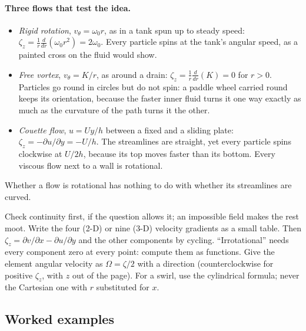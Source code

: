 \paragraph{Three flows that test the idea.}
\begin{itemize}[nosep,leftmargin=*]
\item \emph{Rigid rotation}, $v_\theta = \omega_0 r$, as in a tank spun up to steady speed: $\zeta_z = \frac{1}{r}\frac{d}{dr}(\omega_0 r^2) = 2\omega_0$. Every particle spins at the tank's angular speed, as a painted cross on the fluid would show.
\item \emph{Free vortex}, $v_\theta = K/r$, as around a drain: $\zeta_z = \frac{1}{r}\frac{d}{dr}(K) = 0$ for $r > 0$. Particles go round in circles but do not spin: a paddle wheel carried round keeps its orientation, because the faster inner fluid turns it one way exactly as much as the curvature of the path turns it the other.
\item \emph{Couette flow}, $u = Uy/h$ between a fixed and a sliding plate: $\zeta_z = -\partial u/\partial y = -U/h$. The streamlines are straight, yet every particle spins clockwise at $U/2h$, because its top moves faster than its bottom. Every viscous flow next to a wall is rotational.
\end{itemize}
Whether a flow is rotational has nothing to do with whether its streamlines are curved.

\begin{firstmoves}
Check continuity first, if the question allows it; an impossible field makes the rest moot. Write the four (2-D) or nine (3-D) velocity gradients as a small table. Then $\zeta_z = \partial v/\partial x - \partial u/\partial y$ and the other components by cycling. ``Irrotational'' needs every component zero at every point: compute them as functions. Give the element angular velocity as $\Omega = \zeta/2$ with a direction (counterclockwise for positive $\zeta_z$, with $z$ out of the page). For a swirl, use the cylindrical formula; never the Cartesian one with $r$ substituted for $x$.
\end{firstmoves}

\subsection*{Worked examples}

